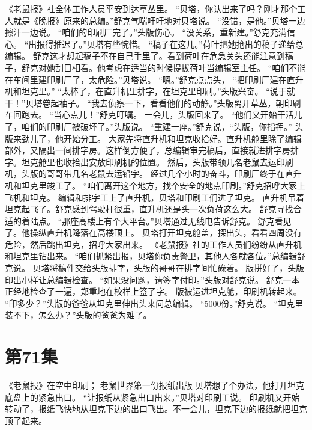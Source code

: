 \documentclass[a4paper,12pt,UTF8,twoside]{ctexbook}
\begin{document}
        《老鼠报》社全体工作人员平安到达草丛里。 
        “贝塔，你认出来了吗？刚才那个工人就是《晚报》原来的总编。”舒克气喘吁吁地对贝塔说。 
        “没错，是他。”贝塔一边擦汗一边说。 
        “咱们的印刷厂完了。”头版伤心。 
        “没关系，重新建。”舒克充满信心。 
        “出报得推迟了。”贝塔有些惋惜。 
        “稿子在这儿。”荷叶把她抢出的稿子递给总编辑。 
        舒克这才想起稿子不在自己手里了。看到荷叶在危急关头还能注意到稿子，舒克对她刮目相看。他考虑在适当的时候提拔荷叶当编辑室主任。 
        “咱们不能在车间里建印刷厂了，太危险。”贝塔说。 
        “嗯。”舒克点点头，  “把印刷厂建在直升机和坦克里。” 
        “太棒了，在直升机里排字，在坦克里印刷。”头版兴奋。 
        “说于就干！”贝塔卷起袖子。 
        “我去侦察一下，看看他们的动静。”头版离开草丛，朝印刷车间跑去。 
        “当心点儿！”舒克叮嘱。 
        一会儿，头版回来了。 
        “他们又开始干活儿了，咱们的印刷厂被破坏了。”头版说。 
        “重建一座。”舒克说，“头版，你指挥。” 
        头版来劲儿了，他开始分工。 
        大家先将直升机和坦克收拾好。直升机舱里除了编辑部外，又隔出一间排字房。这样倒方便了，总编辑审完稿后，直接就进排字房排字。坦克舱里也收拾出安放印刷机的位置。 
        然后，头版带领几名老鼠去运印刷机，头版的哥哥带几名老鼠去运铅字。 
        经过几个小时的奋斗，印刷厂终于在直升机和坦克里竣工了。 
        “咱们离开这个地方，找个安全的地点印刷。”舒克招呼大家上飞机和坦克。 
        编辑和排字工上了直升机，贝塔和印刷工们进了坦克。 
        直升机吊着坦克起飞了。舒克感到驾驶杆很重，直升机还是头一次负荷这么大。 
        舒克寻找合适的着陆点。 
        “那座高楼上有个大平台。”贝塔通过无线电告诉舒克。 
        舒克看见了。他操纵直升机降落在高楼顶上。 
        贝塔打开坦克舱盖，探出头，看看四周没有危险，然后跳出坦克，招呼大家出来。 
        《老鼠报》社的工作人员们纷纷从直升机和坦克里钻出来。 
        “咱们抓紧出报，贝塔你负责警卫，其他人各就各位。”总编辑舒克说。 
        贝塔将稿件交给头版排字，头版的哥哥在排字间忙碌着。 
        版拼好了，头版印出小样让总编辑检查。 
        “如果没问题，请签字付印。”头版对舒克说。 
        舒克一本正经地检查了一遍，郑重地在校样上签了字。 
        版被运进坦克舱，印刷机转起来。 
        “印多少？”头版的爸爸从坦克里伸出头来问总编辑。 
        “5000份。”舒克说。 
        “坦克里装不下，怎么办？”头版的爸爸为难了。   \chapter{第71集} 
        《老鼠报》在空中印刷； 
        老鼠世界第一份报纸出版   
        贝塔想了个办法，他打开坦克底盘上的紧急出口。 
        “让报纸从紧急出口出来。”贝塔对印刷工说。 
        印刷机又开始转动了，报纸飞快地从坦克下边的出口飞出。不一会儿，坦克下边的报纸就把坦克顶了起来。 
\end{document}
